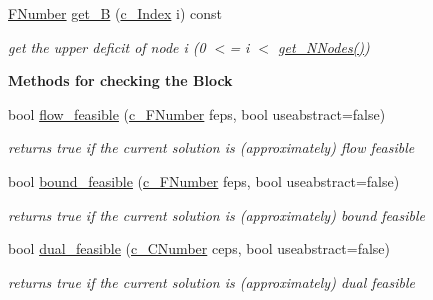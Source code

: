 \begin{Indent}
\begin{DoxyCompactItemize}
\mbox{\hyperlink{class_s_m_spp__di__unipi__it_1_1_m_c_f_block_aeea3e5951d222b2a8e57de1b4246a909}{F\+Number}} \mbox{\hyperlink{class_s_m_spp__di__unipi__it_1_1_m_c_f_block_a1e467673e30479a02c09ca7f5c9dc925}{get\+\_\+B}} (\mbox{\hyperlink{class_s_m_spp__di__unipi__it_1_1_m_c_f_block_aee6156e2ce80720d57a082d80f39d8cc}{c\+\_\+\+Index}} i) const
\begin{DoxyCompactList}\small\item\em get the upper deficit of node i (0 $<$= i $<$ \mbox{\hyperlink{class_s_m_spp__di__unipi__it_1_1_m_c_f_block_afff9080606a5612d33ba20c39d663839}{get\+\_\+\+N\+Nodes()}}) \end{DoxyCompactList}\end{DoxyCompactItemize}
\end{Indent}
\begin{Indent}\textbf{ Methods for checking the Block}\par
\begin{DoxyCompactItemize}
\item 
bool \mbox{\hyperlink{class_s_m_spp__di__unipi__it_1_1_m_c_f_block_a45168e035a71794f255d1355e775596c}{flow\+\_\+feasible}} (\mbox{\hyperlink{class_s_m_spp__di__unipi__it_1_1_m_c_f_block_a956c123a5a6b2b52f033ca1987acd80e}{c\+\_\+\+F\+Number}} feps, bool useabstract=false)
\begin{DoxyCompactList}\small\item\em returns true if the current solution is (approximately) flow feasible \end{DoxyCompactList}\item 
bool \mbox{\hyperlink{class_s_m_spp__di__unipi__it_1_1_m_c_f_block_abd1c590cbb101caa2478b453777f3dc4}{bound\+\_\+feasible}} (\mbox{\hyperlink{class_s_m_spp__di__unipi__it_1_1_m_c_f_block_a956c123a5a6b2b52f033ca1987acd80e}{c\+\_\+\+F\+Number}} feps, bool useabstract=false)
\begin{DoxyCompactList}\small\item\em returns true if the current solution is (approximately) bound feasible \end{DoxyCompactList}\item 
bool \mbox{\hyperlink{class_s_m_spp__di__unipi__it_1_1_m_c_f_block_a88febf409c7a701c7e3f14045ccde2e7}{dual\+\_\+feasible}} (\mbox{\hyperlink{class_s_m_spp__di__unipi__it_1_1_m_c_f_block_a8e47cae4e16e180273d262aae769a854}{c\+\_\+\+C\+Number}} ceps, bool useabstract=false)
\begin{DoxyCompactList}\small\item\em returns true if the current solution is (approximately) dual feasible \end{DoxyCompactList}\item 

\end{DoxyCompactItemize}
\end{Indent}
